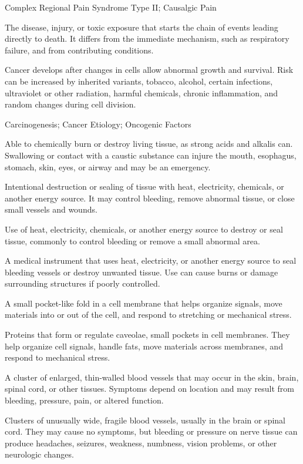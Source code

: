 \synonyms
Complex Regional Pain Syndrome Type II; Causalgic Pain

 The disease, injury, or toxic exposure that starts the chain of events leading directly to death. It differs from the immediate mechanism, such as respiratory failure, and from contributing conditions.

 Cancer develops after changes in cells allow abnormal growth and survival. Risk can be increased by inherited variants, tobacco, alcohol, certain infections, ultraviolet or other radiation, harmful chemicals, chronic inflammation, and random changes during cell division.

\synonyms
Carcinogenesis; Cancer Etiology; Oncogenic Factors

 Able to chemically burn or destroy living tissue, as strong acids and alkalis can. Swallowing or contact with a caustic substance can injure the mouth, esophagus, stomach, skin, eyes, or airway and may be an emergency.

 Intentional destruction or sealing of tissue with heat, electricity, chemicals, or another energy source. It may control bleeding, remove abnormal tissue, or close small vessels and wounds.

 Use of heat, electricity, chemicals, or another energy source to destroy or seal tissue, commonly to control bleeding or remove a small abnormal area.

 A medical instrument that uses heat, electricity, or another energy source to seal bleeding vessels or destroy unwanted tissue. Use can cause burns or damage surrounding structures if poorly controlled.

 A small pocket-like fold in a cell membrane that helps organize signals, move materials into or out of the cell, and respond to stretching or mechanical stress.

 Proteins that form or regulate caveolae, small pockets in cell membranes. They help organize cell signals, handle fats, move materials across membranes, and respond to mechanical stress.

 A cluster of enlarged, thin-walled blood vessels that may occur in the skin, brain, spinal cord, or other tissues. Symptoms depend on location and may result from bleeding, pressure, pain, or altered function.

 Clusters of unusually wide, fragile blood vessels, usually in the brain or spinal cord. They may cause no symptoms, but bleeding or pressure on nerve tissue can produce headaches, seizures, weakness, numbness, vision problems, or other neurologic changes.

